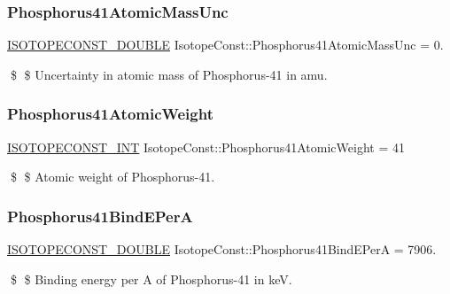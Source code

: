 \subsubsection{\texorpdfstring{Phosphorus41\+Atomic\+Mass\+Unc}{Phosphorus41AtomicMassUnc}}
{\footnotesize\ttfamily \mbox{\hyperlink{group___isotope_const-_macros_ga8f45a7272ce02c0b4c65c44636ed719a}{I\+S\+O\+T\+O\+P\+E\+C\+O\+N\+S\+T\+\_\+\+D\+O\+U\+B\+LE}} Isotope\+Const\+::\+Phosphorus41\+Atomic\+Mass\+Unc = 0.}

\$ \$ Uncertainty in atomic mass of Phosphorus-\/41 in amu. \mbox{\label{group___isotope_const-_phosphorus-_p41_gafa71071d0de18d2521ffdafe0281068a}} 
\subsubsection{\texorpdfstring{Phosphorus41\+Atomic\+Weight}{Phosphorus41AtomicWeight}}
{\footnotesize\ttfamily \mbox{\hyperlink{group___isotope_const-_macros_ga5f18360b3e99483a35c32d789e62621c}{I\+S\+O\+T\+O\+P\+E\+C\+O\+N\+S\+T\+\_\+\+I\+NT}} Isotope\+Const\+::\+Phosphorus41\+Atomic\+Weight = 41}

\$ \$ Atomic weight of Phosphorus-\/41. \mbox{\label{group___isotope_const-_phosphorus-_p41_ga32df729881916fb2bc3a55d65d9bf47d}} 
\subsubsection{\texorpdfstring{Phosphorus41\+Bind\+E\+PerA}{Phosphorus41BindEPerA}}
{\footnotesize\ttfamily \mbox{\hyperlink{group___isotope_const-_macros_ga8f45a7272ce02c0b4c65c44636ed719a}{I\+S\+O\+T\+O\+P\+E\+C\+O\+N\+S\+T\+\_\+\+D\+O\+U\+B\+LE}} Isotope\+Const\+::\+Phosphorus41\+Bind\+E\+PerA = 7906.}

\$ \$ Binding energy per A of Phosphorus-\/41 in keV. \mbox{\label{group___isotope_const-_phosphorus-_p41_ga867dac3076f9bc7f7ff097570641aaac}} 
